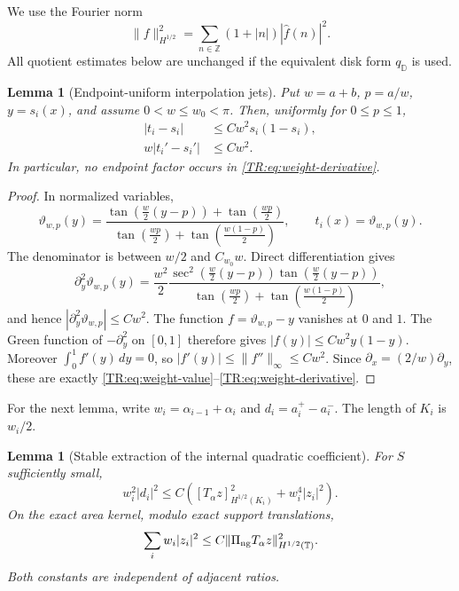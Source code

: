 \documentclass[11pt]{amsart}
\numberwithin{equation}{section}
\newtheorem{lemma}[theorem]{Lemma}
\theoremstyle{definition}
\theoremstyle{remark}
\newcommand{\T}{\mathbb T}
\newcommand{\PiNG}{\Pi_{\rm ng}}
\begin{document}
We use the Fourier norm
\begin{equation}\label{TR:eq:Hhalf}
 \|f\|_{H^{1/2}}^2
 =\sum_{n\in\mathbb Z}(1+|n|)|\widehat f(n)|^2.
\end{equation}
All quotient estimates below are unchanged if the equivalent disk form
$q_{\mathbb D}$ is used.

\begin{lemma}[Endpoint-uniform interpolation jets]
\label{TR:lem:weight-jets}
Put $w=a+b$, $p=a/w$, $y=s_i(x)$, and assume $0<w\le w_0<\pi$.
Then, uniformly for $0\le p\le1$,
\begin{align}
 |t_i-s_i|&\le Cw^2s_i(1-s_i),
 \label{TR:eq:weight-value}\\
 w|t_i'-s_i'|&\le Cw^2.
 \label{TR:eq:weight-derivative}
\end{align}
In particular, no endpoint factor occurs in
\eqref{TR:eq:weight-derivative}.
\end{lemma}

\begin{proof}
In normalized variables,
\begin{equation}\label{TR:eq:normalized-t}
 \vartheta_{w,p}(y)=
 \frac{\tan(\frac w2(y-p))+\tan(\frac{wp}2)}
 {\tan(\frac{wp}2)+\tan(\frac{w(1-p)}2)},
 \qquad t_i(x)=\vartheta_{w,p}(y).
\end{equation}
The denominator is between $w/2$ and $C_{w_0}w$.  Direct
differentiation gives
\begin{equation}\label{TR:eq:normalized-second}
 \partial_y^2\vartheta_{w,p}(y)
 =\frac{w^2}{2}
 \frac{\sec^2(\frac w2(y-p))\tan(\frac w2(y-p))}
 {\tan(\frac{wp}2)+\tan(\frac{w(1-p)}2)},
\end{equation}
and hence $|\partial_y^2\vartheta_{w,p}|\le Cw^2$.
The function $f=\vartheta_{w,p}-y$ vanishes at $0$ and $1$.
The Green function of $-\partial_y^2$ on $[0,1]$ therefore gives
$|f(y)|\le Cw^2y(1-y)$.  Moreover
$\int_0^1f'(y)\,dy=0$, so
$|f'(y)|\le\|f''\|_\infty\le Cw^2$.  Since
$\partial_x=(2/w)\partial_y$, these are exactly
\eqref{TR:eq:weight-value}--\eqref{TR:eq:weight-derivative}.
\end{proof}

For the next lemma, write $w_i=\alpha_{i-1}+\alpha_i$ and
$d_i=a_i^+-a_i^-$.  The length of $K_i$ is $w_i/2$.

\begin{lemma}[Stable extraction of the internal quadratic coefficient]
\label{TR:lem:coefficient-stability}
For $S$ sufficiently small,
\begin{equation}\label{TR:eq:local-coefficient}
 w_i^2|d_i|^2
 \le C\left(
 [T_\alpha z]_{H^{1/2}(K_i)}^2+w_i^4|z_i|^2\right).
\end{equation}
On the exact area kernel, modulo exact support translations,
\begin{equation}\label{TR:eq:nodal-sampling}
 \sum_iw_i|z_i|^2
 \le C\|\PiNG T_\alpha z\|_{H^{1/2}(\T)}^2.
\end{equation}
Both constants are independent of adjacent ratios.
\end{lemma}
\end{document}
